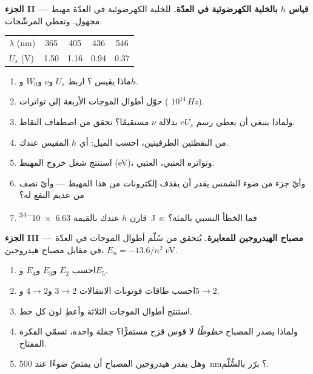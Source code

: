 \begin{problem}
\medskip
\noindent\textbf{الجزء II --- قياس $h$ بالخلية الكهرضوئية في العدّة.}
للخلية الكهرضوئية في العدّة مهبط مجهول. وتعطي المرشّحات:
\begin{center}\small
\begin{tabular}{lcccc}
$\lambda$ (\unit{nm}) & 365 & 405 & 436 & 546\\
$U_s$ (\unit{V}) & 1.50 & 1.16 & 0.94 & 0.37
\end{tabular}
\end{center}
\begin{enumerate}[resume]
  \item ماذا يقيس ؟ اربط $U_s$ و$\nu$ و$W_0$ و$h$.
  \item حوّل أطوال الموجات الأربعة إلى تواترات ( $10^{14}\,\unit{Hz}$).
  \item ولماذا ينبغي أن يعطي رسم $eU_s$ بدلالة $\nu$ مستقيمًا؟
        تحقق من اصطفاف النقاط.
  \item من النقطتين الطرفيتين، احسب الميل: أي $h$ المقيس عندك.
  \item استنتج شغل خروج المهبط (\unit{eV})، وتواتره
        العتبي،  العتبي.
  \item وأيّ جزء من ضوء الشمس يقدر أن يقذف إلكترونات من هذا
        المهبط --- وأيّ نصف من  عديم النفع له؟
  \item قارن $h$ عندك بالقيمة \qty{6.63e-34}{J.s}: فما الخطأ النسبي بالمئة؟
\end{enumerate}

\medskip
\noindent\textbf{الجزء III --- مصباح الهيدروجين للمعايرة.}
يُتحقق من سُلّم أطوال الموجات في العدّة في مقابل مصباح هيدروجين،
$E_n = -13.6/n^2$ \unit{eV}.
\begin{enumerate}[resume]
  \item احسب $E_2$ و$E_3$ و$E_4$ و$E_5$.
  \item احسب طاقات فوتونات الانتقالات $3 \to 2$ و$4 \to 2$ و$5 \to 2$.
  \item استنتج أطوال الموجات الثلاثة وأعطِ لون كل خط.
  \item ولماذا يصدر المصباح \emph{خطوطًا} لا قوس قزح
        مستمرًّا؟ جملة واحدة، تسمّي الفكرة المفتاح.
  \item وهل يقدر هيدروجين المصباح أن يمتصّ ضوءًا عند \qty{500}{nm}؟ برّر بالسُّلّم.
\end{enumerate}


\end{problem}

